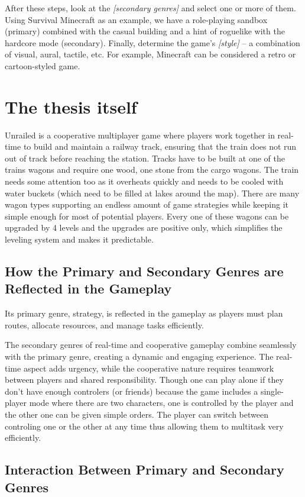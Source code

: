 \documentclass[a4paper,10pt,english]{article}
\newcommand{\ph}[1]{\textit{[#1]}}
\begin{document}
After these steps, look at the \ph{secondary genres} and select one or more of them. Using Survival Minecraft as an example, we have a role-playing sandbox (primary) combined with the casual building and a hint of roguelike with the hardcore mode (secondary). Finally, determine the game's \ph{style} -- a combination of visual, aural, tactile, etc. For example, Minecraft can be considered a retro or cartoon-styled game.

\newpage
\section{The thesis itself}
Unrailed is a cooperative multiplayer game where players work together in real-time to build and maintain a railway track, ensuring that the train does not run out of track before reaching the station. Tracks have to be built at one of the trains wagons and require one wood, one stone from the cargo wagons. The train needs some attention too as it overheats quickly and needs to be cooled with water buckets (which need to be filled at lakes around the map). 
There are many wagon types supporting an endless amount of game strategies while keeping it simple enough for most of potential players. Every one of these wagons can be upgraded by 4 levels and the upgrades are positive only, which simplifies the leveling system and makes it predictable.

\subsection*{How the Primary and Secondary Genres are Reflected in the Gameplay}
Its primary genre, strategy, is reflected in the gameplay as players must plan routes, allocate resources, and manage tasks efficiently.

The secondary genres of real-time and cooperative gameplay combine seamlessly with the primary genre, creating a dynamic and engaging experience. The real-time aspect adds urgency, while the cooperative nature requires teamwork between players and shared responsibility. Though one can play alone if they don't have enough controlers (or friends) because the game includes a single-player mode where there are two characters, one is controlled by the player and the other one can be given simple orders. The player can switch between controling one or the other at any time thus allowing them to multitask very efficiently.

\subsection*{Interaction Between Primary and Secondary Genres}
\end{document}

